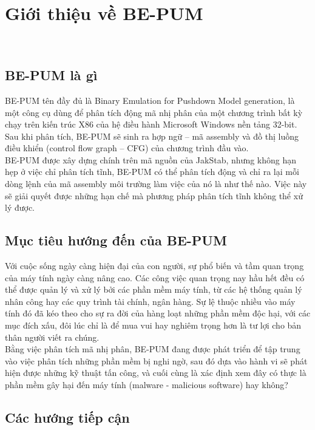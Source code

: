
\section{Giới thiệu về BE-PUM}\

	\subsection{BE-PUM là gì}

BE-PUM tên đầy đủ là Binary Emulation for Pushdown Model generation, là một công cụ dùng để phân tích động mã nhị phân của một chương trình bất kỳ chạy trên kiến trúc X86 của hệ điều hành Microsoft Windows nền tảng 32-bit. Sau khi phân tích, BE-PUM sẽ sinh ra hợp ngữ – mã assembly và đồ thị luồng điều khiển (control flow graph – CFG) của chương trình đầu vào.\\

BE-PUM được xây dựng chính trên mã nguồn của JakStab, nhưng không hạn hẹp ở việc chỉ phân tích tĩnh, BE-PUM có thể phân tích động và chỉ ra lại mỗi dòng lệnh của mã assembly môi trường làm việc của nó là như thế nào. Việc này sẽ giải quyết được những hạn chế mà phương pháp phân tích tĩnh không thể xử lý được.

	\subsection{Mục tiêu hướng đến của BE-PUM}

Với cuộc sống ngày càng hiện đại của con người, sự phổ biến và tầm quan trọng của máy tính ngày càng nâng cao. Các công việc quan trọng nay hầu hết đều có thể được quản lý và xử lý bởi các phần mềm máy tính, từ các hệ thống quản lý nhân công hay các quy trình tài chính, ngân hàng. Sự lệ thuộc nhiều vào máy tính đó đã kéo theo cho sự ra đời của hàng loạt những phần mềm độc hại, với các mục đích xấu, đôi lúc chỉ là để mua vui hay nghiêm trọng hơn là tư lợi cho bản thân người viết ra chúng. \\

Bằng việc phân tích mã nhị phân, BE-PUM đang được phát triển để tập trung vào việc phân tích những phần mềm bị nghi ngờ, sau đó dựa vào hành vi sẽ phát hiện được những kỹ thuật tấn công, và cuối cùng là xác định xem đây có thực là phần mềm gây hại đến máy tính (malware - malicious software) hay không?

	\subsection{Các hướng tiếp cận}

